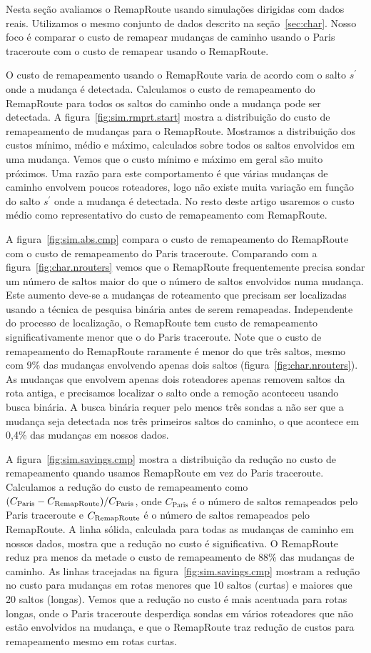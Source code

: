 \documentclass{JBCS}
\newcommand{\rmprt}{{Re\-map\-Rou\-te}}
\newcommand{\figstr}{figura}
\newcommand{\secstr}{seção}
\begin{document}
Nesta seção avaliamos o \rmprt{} usando simulações dirigidas com dados
reais.  Utilizamos o mesmo conjunto de dados descrito na
\secstr~\ref{sec:char}.  Nosso foco é comparar o custo de remapear
mudanças de caminho usando o Paris traceroute com o custo de remapear
usando o \rmprt.

O custo de remapeamento usando o \rmprt{} varia de acordo com o salto
$s^\prime$ onde a mudança é detectada.  Calculamos o custo de
remapeamento do \rmprt{} para todos os saltos do caminho onde a mudança
pode ser detectada.  A \figstr~\ref{fig:sim.rmprt.start} mostra a
distribuição do custo de remapeamento de mudanças para o \rmprt{}.
Mostramos a distribuição dos custos mínimo, médio e máximo, calculados
sobre todos os saltos envolvidos em uma mudança.  Vemos que o custo
mínimo e máximo em geral são muito próximos.  Uma razão para este
comportamento é que várias mudanças de caminho envolvem poucos
roteadores, logo não existe muita variação em função do salto $s^\prime$
onde a mudança é detectada.  No resto deste artigo usaremos o custo
médio como representativo do custo de remapeamento com \rmprt{}.

A \figstr~\ref{fig:sim.abs.cmp} compara o custo de remapeamento do
\rmprt{} com o custo de remapeamento do Paris traceroute.  Comparando
com a \figstr~\ref{fig:char.nrouters} vemos que o \rmprt{}
frequentemente precisa sondar um número de saltos maior do que o número
de saltos envolvidos numa mudança.  Este aumento deve-se a mudanças de
roteamento que precisam ser localizadas usando a técnica de pesquisa
binária antes de serem remapeadas.  Independente do processo de
localização, o \rmprt{} tem custo de remapeamento significativamente
menor que o do Paris traceroute.  Note que o custo de remapeamento do
\rmprt{} raramente é menor do que três saltos, mesmo com 9\% das
mudanças envolvendo apenas dois saltos
(\figstr~\ref{fig:char.nrouters}).  As mudanças que envolvem apenas dois
roteadores apenas removem saltos da rota antiga, e precisamos localizar
o salto onde a remoção aconteceu usando busca binária.  A busca binária
requer pelo menos três sondas a não ser que a mudança seja detectada nos
três primeiros saltos do caminho, o que acontece em 0,4\% das mudanças
em nossos dados.

A \figstr~\ref{fig:sim.savings.cmp} mostra a distribuição da redução no
custo de remapeamento quando usamos \rmprt{} em vez do Paris traceroute.
Calculamos a redução do custo de remapeamento como $(C_\mathrm{Paris} -
C_\mathrm{\rmprt})/C_\mathrm{Paris}$, onde $C_\mathrm{Paris}$ é o número
de saltos remapeados pelo Paris traceroute e $C_\mathrm{\rmprt}$ é o
número de saltos remapeados pelo \rmprt{}.  A linha sólida, calculada
para todas as mudanças de caminho em nossos dados, mostra que a redução
no custo é significativa.  O \rmprt{} reduz pra menos da metade o custo
de remapeamento de 88\% das mudanças de caminho.  As linhas tracejadas
na \figstr~\ref{fig:sim.savings.cmp} mostram a redução no custo para
mudanças em rotas menores que 10 saltos (curtas) e maiores que 20 saltos
(longas).  Vemos que a redução no custo é mais acentuada para rotas
longas, onde o Paris traceroute desperdiça sondas em vários roteadores
que não estão envolvidos na mudança, e que o \rmprt{} traz redução de
custos para remapeamento mesmo em rotas curtas.
\end{document}
